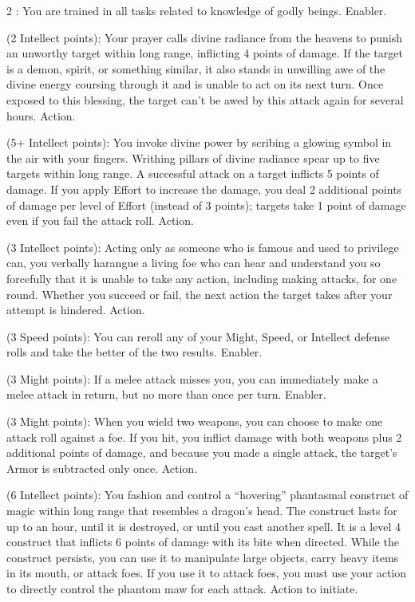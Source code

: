 \begin{multicols}{2}
: You are trained in all tasks related to knowledge of godly beings. Enabler. 
 
 (2 Intellect points): Your prayer calls divine radiance from the heavens to punish an unworthy target within long range, inflicting 4 points of damage. If the target is a demon, spirit, or something similar, it also stands in unwilling awe of the divine energy coursing through it and is unable to act on its next turn. Once exposed to this blessing, the target can’t be awed by this attack again for several hours. Action. 
 
 (5+ Intellect points): You invoke divine power by scribing a glowing symbol in the air with your fingers. Writhing pillars of divine radiance spear up to five targets within long range. A successful attack on a target inflicts 5 points of damage. If you apply Effort to increase the damage, you deal 2 additional points of damage per level of Effort (instead of 3 points); targets take 1 point of damage even if you fail the attack roll. Action. 
 
 (3 Intellect points): Acting only as someone who is famous and used to privilege can, you verbally harangue a living foe who can hear and understand you so forcefully that it is unable to take any action, including making attacks, for one round. Whether you succeed or fail, the next action the target takes after your attempt is hindered. Action. 
 
 (3 Speed points): You can reroll any of your Might, Speed, or Intellect defense rolls and take the better of the two results. Enabler. 
 
 (3 Might points): If a melee attack misses you, you can immediately make a melee attack in return, but no more than once per turn. Enabler. 
 
 (3 Might points): When you wield two weapons, you can choose to make one attack roll against a foe. If you hit, you inflict damage with both weapons plus 2 additional points of damage, and because you made a single attack, the target’s Armor is subtracted only once. Action. 
 
 (6 Intellect points): You fashion and control a “hovering” phantasmal construct of magic within long range that resembles a dragon’s head. The construct lasts for up to an hour, until it is destroyed, or until you cast another spell. It is a level 4 construct that inflicts 6 points of damage with its bite when directed. While the construct persists, you can use it to manipulate large objects, carry heavy items in its mouth, or attack foes. If you use it to attack foes, you must use your action to directly control the phantom maw for each attack. Action to initiate.
 

\end{multicols}
